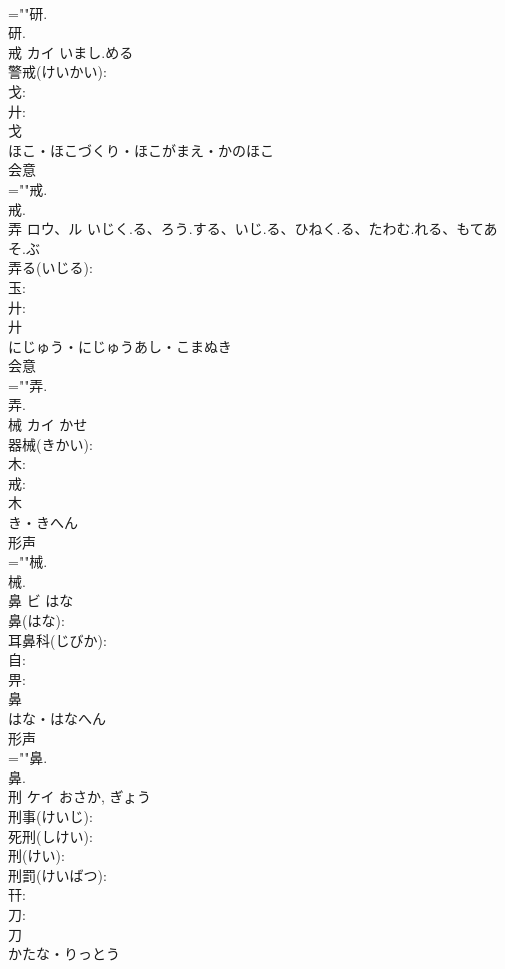 \documentclass[8pt]{extreport}
\begin{document}
\begin{CJK}{UTF8}{min}
\\	=""研.
\\	研.
\\	戒	カイ	いまし.める		
\\	警戒(けいかい): 
\\	戈: 
\\	廾: 
\\	戈	
\\	ほこ・ほこづくり・ほこがまえ・かのほこ	
\\	会意 
\\	=""戒.
\\	戒.
\\	弄	ロウ、ル	いじく.る、ろう.する、いじ.る、ひねく.る、たわむ.れる、もてあそ.ぶ		
\\	弄る(いじる): 
\\	玉: 
\\	廾: 
\\	廾	
\\	にじゅう・にじゅうあし・こまぬき	
\\	会意 
\\	=""弄.
\\	弄.
\\	械	カイ	かせ		
\\	器械(きかい): 
\\	木: 
\\	戒: 
\\	木	
\\	き・きへん	
\\	形声 
\\	=""械.
\\	械.
\\	鼻	ビ	はな		
\\	鼻(はな): 
\\	耳鼻科(じびか): 
\\	自: 
\\	畀: 
\\	鼻	
\\	はな・はなへん	
\\	形声 
\\	=""鼻.
\\	鼻.
\\	刑	ケイ		おさか, ぎょう	
\\	刑事(けいじ): 
\\	死刑(しけい): 
\\	刑(けい): 
\\	刑罰(けいばつ): 
\\	幵: 
\\	刀: 
\\	刀	
\\	かたな・りっとう	

\end{CJK}
\end{document}
